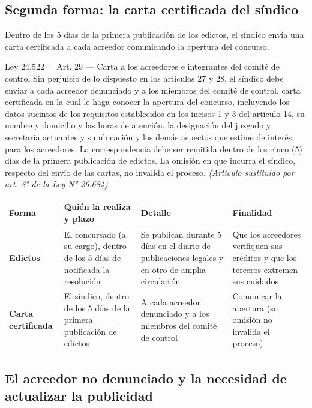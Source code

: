 \documentclass[12pt,oneside]{book}
\begin{document}
\subsection{Segunda forma: la carta certificada del síndico}

Dentro de los 5 días de la primera publicación de los edictos, el síndico envía una carta certificada a cada acreedor comunicando la apertura del concurso.

\begin{norma}{Ley 24.522 · Art. 29 — Carta a los acreedores e integrantes del comité de control}
Sin perjuicio de lo dispuesto en los artículos 27 y 28, el síndico debe enviar a cada acreedor denunciado y a los miembros del comité de control, carta certificada en la cual le haga conocer la apertura del concurso, incluyendo los datos sucintos de los requisitos establecidos en los incisos 1 y 3 del artículo 14, su nombre y domicilio y las horas de atención, la designación del juzgado y secretaría actuantes y su ubicación y los demás aspectos que estime de interés para los acreedores. La correspondencia debe ser remitida dentro de los cinco (5) días de la primera publicación de edictos. La omisión en que incurra el síndico, respecto del envío de las cartas, no invalida el proceso. \textit{(Artículo sustituido por art. 8° de la Ley N° 26.684)}
\end{norma}

\begingroup
\small
\renewcommand{\arraystretch}{1.25}
\begin{tabularx}{\textwidth}{>{\raggedright\arraybackslash}p{} Y Y Y}
\toprule
\textbf{Forma} & \textbf{Quién la realiza y plazo} & \textbf{Detalle} & \textbf{Finalidad} \\
\midrule
\textbf{Edictos} & El concursado (a su cargo), dentro de los 5 días de notificada la resolución & Se publican durante 5 días en el diario de publicaciones legales y en otro de amplia circulación & Que los acreedores verifiquen sus créditos y que los terceros extremen sus cuidados \\
\textbf{Carta certificada} & El síndico, dentro de los 5 días de la primera publicación de edictos & A cada acreedor denunciado y a los miembros del comité de control & Comunicar la apertura (su omisión no invalida el proceso) \\
\bottomrule
\end{tabularx}
\endgroup

\subsection{El acreedor no denunciado y la necesidad de actualizar la publicidad}
\end{document}
